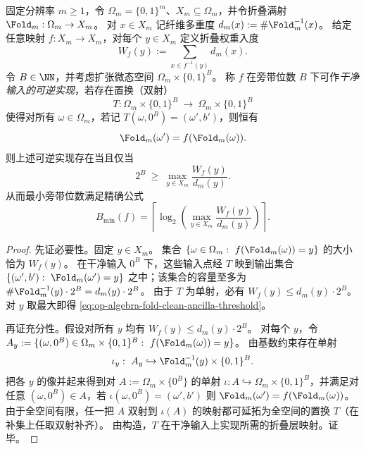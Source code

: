 \begin{theorem}[折叠权重入度的最小干净旁带可逆扩张阈值]\label{thm:op-algebra-fold-clean-ancilla-reversible-dilation}
固定分辨率 \(m\ge 1\)，令 \(\Omega_m=\{0,1\}^m\)、\(X_m\subseteq\Omega_m\)，并令折叠满射 \(\Fold_m:\Omega_m\to X_m\)。
对 \(x\in X_m\) 记纤维多重度 \(d_m(x):=\#\Fold_m^{-1}(x)\)。
给定任意映射 \(f:X_m\to X_m\)，对每个 \(y\in X_m\) 定义折叠权重入度
\begin{equation}\label{eq:op-algebra-fold-weighted-indegree}
W_f(y):=\sum_{x\in f^{-1}(y)} d_m(x).
\end{equation}
令 \(B\in\NN\)，并考虑扩张微态空间 \(\Omega_m\times\{0,1\}^B\)。
称 \(f\) 在旁带位数 \(B\) 下可作\emph{干净输入的可逆实现}，若存在置换（双射）
\[
T:\Omega_m\times\{0,1\}^B\ \longrightarrow\ \Omega_m\times\{0,1\}^B
\]
使得对所有 \(\omega\in\Omega_m\)，若记
\(
T(\omega,0^B)=(\omega',b')
\)，则恒有
\[
\Fold_m(\omega')=f(\Fold_m(\omega)).
\]
则上述可逆实现存在当且仅当
\begin{equation}\label{eq:op-algebra-fold-clean-ancilla-threshold}
2^B\ \ge\ \max_{y\in X_m}\frac{W_f(y)}{d_m(y)}.
\end{equation}
从而最小旁带位数满足精确公式
\[
B_{\min}(f)=
\left\lceil
\log_2\!\left(\max_{y\in X_m}\frac{W_f(y)}{d_m(y)}\right)
\right\rceil.
\]
\end{theorem}
\begin{proof}
先证必要性。固定 \(y\in X_m\)。
集合
\(
\{\omega\in\Omega_m:\ f(\Fold_m(\omega))=y\}
\)
的大小恰为 \(W_f(y)\)。
在干净输入 \(0^B\) 下，这些输入点经 \(T\) 映到输出集合
\(
\{(\omega',b'):\ \Fold_m(\omega')=y\}
\)
之中；该集合的容量至多为 \(\#\Fold_m^{-1}(y)\cdot 2^B=d_m(y)\cdot 2^B\)。
由于 \(T\) 为单射，必有 \(W_f(y)\le d_m(y)\cdot 2^B\)。
对 \(y\) 取最大即得 \eqref{eq:op-algebra-fold-clean-ancilla-threshold}。
\par
再证充分性。假设对所有 \(y\) 均有 \(W_f(y)\le d_m(y)\cdot 2^B\)。
对每个 \(y\)，令
\(
A_y:=\{(\omega,0^B)\in\Omega_m\times\{0,1\}^B:\ f(\Fold_m(\omega))=y\}
\)。
由基数约束存在单射
\[
\iota_y:\ A_y\hookrightarrow \Fold_m^{-1}(y)\times\{0,1\}^B.
\]
把各 \(y\) 的像并起来得到对
\(
A:=\Omega_m\times\{0^B\}
\)
的单射
\(
\iota:A\hookrightarrow \Omega_m\times\{0,1\}^B
\)，并满足对任意 \((\omega,0^B)\in A\)，若 \(\iota(\omega,0^B)=(\omega',b')\) 则 \(\Fold_m(\omega')=f(\Fold_m(\omega))\)。
由于全空间有限，任一把 \(A\) 双射到 \(\iota(A)\) 的映射都可延拓为全空间的置换 \(T\)（在补集上任取双射补齐）。
由构造，\(T\) 在干净输入上实现所需的折叠层映射。证毕。
\end{proof}

